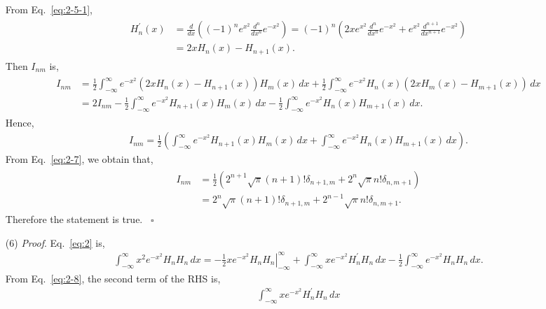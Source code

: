 \documentclass[floatfix,nofootinbib,superscriptaddress,fleqn]{revtex4-2}
\begin{document}
\begin{itemize}
\begin{align*}
\end{align*}
From Eq.~\eqref{eq:2-5-1},
\begin{align}\label{eq:2-8}
  \begin{split}
    H^\prime_n(x) &= \frac{d}{dx}\left( (-1)^ne^{x^2}
    \frac{d^n}{dx^n}e^{-x^2} \right)
    =(-1)^n\left( 2xe^{x^2}\frac{d^n}{dx^n}e^{-x^2}
    +e^{x^2}\frac{d^{n+1}}{dx^{n+1}}e^{-x^2} \right)  \\
    &=2xH_n(x)-H_{n+1}(x).
  \end{split}
\end{align}
Then $I_{nm}$ is,
\begin{align*}
  \begin{split}
    I_{nm} &= \frac{1}{2}\int_{-\infty}^\infty 
    e^{-x^2}(2xH_n(x)-H_{n+1}(x))H_m(x) \,dx+
    \frac{1}{2}\int_{-\infty}^\infty 
    e^{-x^2}H_n(x)(2xH_m(x)-H_{m+1}(x)) \,dx  \\
    &= 2I_{nm}
    -\frac{1}{2}\int_{-\infty}^\infty 
    e^{-x^2}H_{n+1}(x)H_m(x) \,dx
    -\frac{1}{2}\int_{-\infty}^\infty 
    e^{-x^2}H_n(x)H_{m+1}(x) \,dx.
  \end{split}
\end{align*}
Hence,
\begin{align*}
  I_{nm}=\frac{1}{2}\left(\int_{-\infty}^\infty 
  e^{-x^2}H_{n+1}(x)H_m(x) \,dx
  +\int_{-\infty}^\infty 
  e^{-x^2}H_n(x)H_{m+1}(x) \,dx\right).
\end{align*}
From Eq.~\eqref{eq:2-7}, we obtain that,
\begin{align}\label{eq:2-9}
  \begin{split}
    I_{nm}&=\frac{1}{2}\left(2^{n+1}\sqrt{\pi}(n+1)!
    \delta_{n+1,m}
    +2^n\sqrt{\pi}n!\delta_{n,m+1} \right)  \\
    &=2^n\sqrt{\pi}(n+1)!\delta_{n+1,m}
    +2^{n-1}\sqrt{\pi}n!\delta_{n,m+1}.
  \end{split}
\end{align}
Therefore the statement is true. ~\hfill $\square$
\item[(6)] {\it Proof}. Eq.~\eqref{eq:2} is,
\begin{align*}
  \int_{-\infty}^\infty x^2e^{-x^2}H_nH_n \,dx  
  =-\left.\frac{1}{2}xe^{-x^2}H_nH_n\right|_{-\infty}^\infty
  +\int_{-\infty}^\infty xe^{-x^2}H_n^\prime H_n \,dx  
  -\frac{1}{2}\int_{-\infty}^\infty e^{-x^2}H_nH_n \,dx  .
\end{align*}
From Eq.~\eqref{eq:2-8}, the second term of the RHS is,
\begin{align*}
  \int_{-\infty}^\infty xe^{-x^2}H_n^\prime H_n \,dx  

\end{align*}
\end{itemize}
\end{document}
